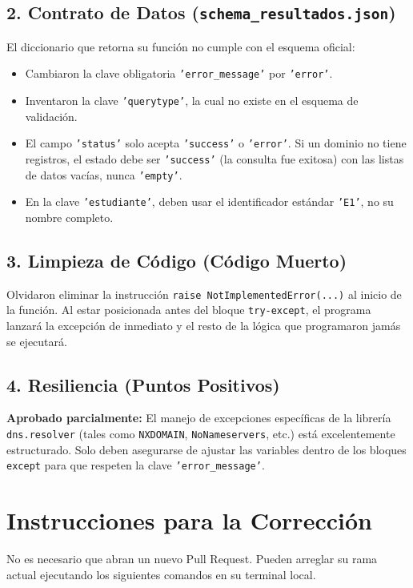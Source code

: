 \documentclass[12pt,a4paper]{article}
\begin{document}
\subsection*{2. Contrato de Datos (\texttt{schema\_resultados.json})}
El diccionario que retorna su función no cumple con el esquema oficial:
\begin{itemize}[label=$\bullet$]
    \item Cambiaron la clave obligatoria \texttt{'error\_message'} por \texttt{'error'}.
    \item Inventaron la clave \texttt{'querytype'}, la cual no existe en el esquema de validación.
    \item El campo \texttt{'status'} solo acepta \texttt{'success'} o \texttt{'error'}. Si un dominio no tiene registros, el estado debe ser \texttt{'success'} (la consulta fue exitosa) con las listas de datos vacías, nunca \texttt{'empty'}.
    \item En la clave \texttt{'estudiante'}, deben usar el identificador estándar \texttt{'E1'}, no su nombre completo.
\end{itemize}

\subsection*{3. Limpieza de Código (Código Muerto)}
Olvidaron eliminar la instrucción \texttt{raise NotImplementedError(...)} al inicio de la función. Al estar posicionada antes del bloque \texttt{try-except}, el programa lanzará la excepción de inmediato y el resto de la lógica que programaron jamás se ejecutará.

\subsection*{4. Resiliencia (Puntos Positivos)}
\textcolor{green!70!black}{\textbf{Aprobado parcialmente:}} El manejo de excepciones específicas de la librería \texttt{dns.resolver} (tales como \texttt{NXDOMAIN}, \texttt{NoNameservers}, etc.) está excelentemente estructurado. Solo deben asegurarse de ajustar las variables dentro de los bloques \texttt{except} para que respeten la clave \texttt{'error\_message'}.

\section*{Instrucciones para la Corrección}
No es necesario que abran un nuevo Pull Request. Pueden arreglar su rama actual ejecutando los siguientes comandos en su terminal local. 
\end{document}
